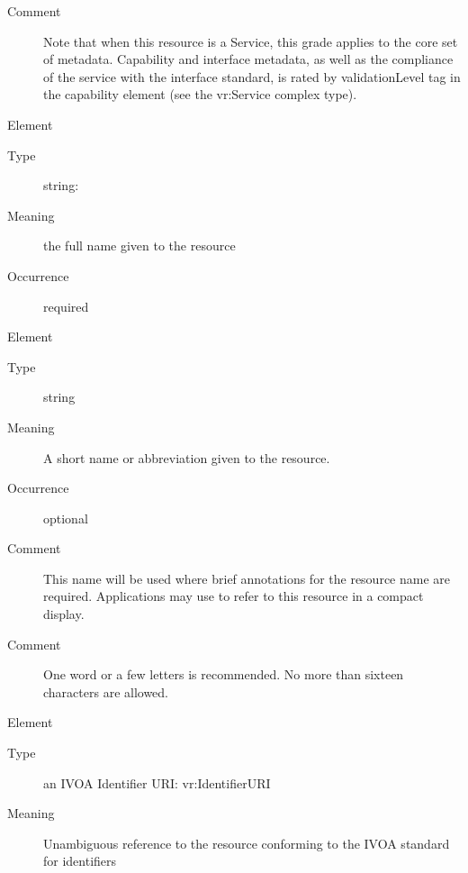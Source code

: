 \documentclass[11pt,a4paper]{ivoa}
\begin{document}
\begin{generated}
\begin{bigdescription}
\begin{description}
\item[Comment] 
                  Note that when this resource is a Service, this
                  grade applies to the core set of metadata.
                  Capability and interface metadata, as well as the
                  compliance of the service with the interface
                  standard, is rated by validationLevel tag in the 
                  capability element (see the vr:Service complex
                  type).  
               

\end{description}
\item[Element \xmlel{title}]
\begin{description}
\item[Type] string: 
\item[Meaning] 
                  the full name given to the resource
               
\item[Occurrence] required

\end{description}
\item[Element \xmlel{shortName}]
\begin{description}
\item[Type] string
\item[Meaning] 
                 A short name or abbreviation given to the resource.
               
\item[Occurrence] optional

\item[Comment] 
                 This name will be used where brief annotations for
                 the resource name are required.  Applications may 
                 use to refer to this resource in a compact display.   
               
\item[Comment] 
                 One word or a few letters is recommended.  No more
                 than sixteen characters are allowed.
               

\end{description}
\item[Element \xmlel{identifier}]
\begin{description}
\item[Type] an IVOA Identifier URI: vr:IdentifierURI
\item[Meaning] 
                 Unambiguous reference to the resource conforming to the IVOA
                 standard for identifiers
               

\end{description}
\end{bigdescription}
\end{generated}
\end{document}
